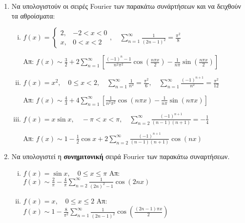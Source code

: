 \documentclass[a4paper,table]{report}
\begin{document}
\begin{enumerate}
  \item Να υπολογιστούν οι σειρές \textlatin{Fourier} των παρακάτω συνάρτήσεων και 
    να δειχθούν τα αθροίσματα:
    \begin{enumerate}[i)]
      \item $ f(x) = 
        \begin{cases}
          2, & -2<x<0 \\
          x, & 0<x<2
        \end{cases}, \quad \sum_{n=1}^{\infty} \frac{1}{(2n-1)^{2}} = \frac{\pi ^{2}}{8}$

        \hfill Απ: $ f(x) \sim \frac{3}{2} + 2 \sum_{n=1}^{\infty}
        \left[\frac{(-1)^{n}-1}{n^{2} \pi ^{2}} \cos{\left(\frac{n \pi x}{2}\right)}  - 
        \frac{1}{n \pi} \sin{\left(\frac{n \pi x}{2}\right)}\right] $  

      \item $ f(x) = x^{2}, \quad 0 \leq x < 2, \quad \sum_{n=1}^{\infty}
        \frac{1}{n^{2}} = \frac{\pi^{2}}{6}, \quad \sum_{n=1}^{\infty}
        \frac{(-1)^{n+1}}{n^{2}} = \frac{\pi ^{2}}{12} $

        \hfill Απ: $ f(x) \sim \frac{4}{3} + 4 \sum_{n=1}^{\infty} 
        \left[\frac{1}{n^{2} \pi ^{2}} \cos{(n \pi x )} - \frac{1}{n \pi}
        \sin{(n \pi x)}\right] $ 

      \item $ f(x) = x \sin{x}, \quad - \pi < x < \pi, \quad \sum_{n=2}^{\infty}
        \frac{(-1)^{n+1}}{(n-1)(n+1)} = - \frac{1}{4} $

        \hfill Απ: $ f(x) \sim 1 - \frac{1}{2} \cos{x} + 2\sum_{n=2}^{\infty}
        \frac{(-1)^{n+1}}{(n-1)(n+1)} \cos{(nx)} $ 
    \end{enumerate}

  \item Να υπολογιστεί η \textbf{συνημιτονική} σειρά \textlatin{Fourier} των παρακάτω 
    συναρτήσεων.
    \begin{enumerate}[i)]
      \item $ f(x) = \sin{x} , \quad 0 \leq x \leq \pi $ 
        \hfill Απ: $ f(x) \sim \frac{2}{\pi} - \frac{4}{\pi} \sum_{n=2}^{\infty}
        \frac{1}{(2n)^{2}-1} \cos{(2nx)} $ 
      \item $ f(x) = x, \quad 0 \leq x \leq 2 $ 
        \hfill Απ: $ f(x) \sim 1 - \frac{8}{\pi ^{2}} \sum_{n=1}^{\infty}
        \frac{1}{(2n-1)^{2}} \cos{\left(\frac{(2n-1) \pi x}{2}\right)} $ 
    \end{enumerate}


\end{enumerate}
\end{document}
